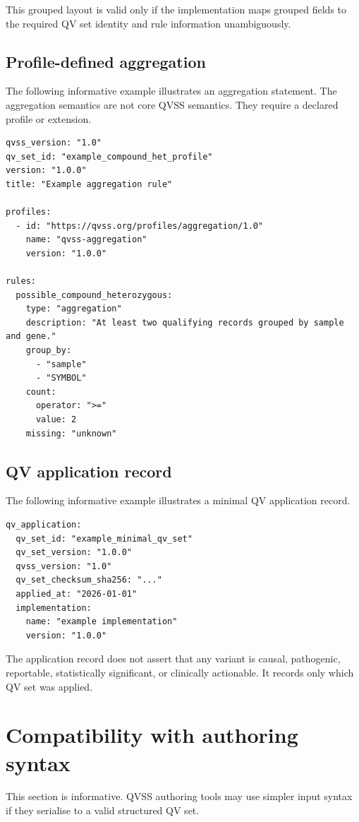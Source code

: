 \documentclass[11pt,a4paper]{article}
\begin{document}
This grouped layout is valid only if the implementation maps grouped fields to the required QV set identity and rule information unambiguously.

\subsection{Profile-defined aggregation}

The following informative example illustrates an aggregation statement. The aggregation semantics are not core QVSS semantics. They require a declared profile or extension.

\begin{verbatim}
qvss_version: "1.0"
qv_set_id: "example_compound_het_profile"
version: "1.0.0"
title: "Example aggregation rule"

profiles:
  - id: "https://qvss.org/profiles/aggregation/1.0"
    name: "qvss-aggregation"
    version: "1.0.0"

rules:
  possible_compound_heterozygous:
    type: "aggregation"
    description: "At least two qualifying records grouped by sample and gene."
    group_by:
      - "sample"
      - "SYMBOL"
    count:
      operator: ">="
      value: 2
    missing: "unknown"
\end{verbatim}

\subsection{QV application record}

The following informative example illustrates a minimal QV application record.

\begin{verbatim}
qv_application:
  qv_set_id: "example_minimal_qv_set"
  qv_set_version: "1.0.0"
  qvss_version: "1.0"
  qv_set_checksum_sha256: "..."
  applied_at: "2026-01-01"
  implementation:
    name: "example implementation"
    version: "1.0.0"
\end{verbatim}

The application record does not assert that any variant is causal, pathogenic, reportable, statistically significant, or clinically actionable. It records only which QV set was applied.

\section{Compatibility with authoring syntax}

This section is informative. QVSS authoring tools may use simpler input syntax if they serialise to a valid structured QV set.
\end{document}
